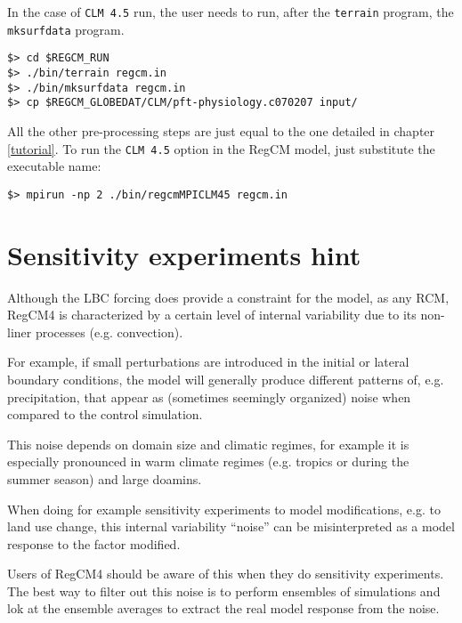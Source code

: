 In the case of \verb=CLM 4.5= run, the user needs to run, after the
\verb=terrain= program, the \verb=mksurfdata= program.

\begin{Verbatim}
$> cd $REGCM_RUN
$> ./bin/terrain regcm.in
$> ./bin/mksurfdata regcm.in
$> cp $REGCM_GLOBEDAT/CLM/pft-physiology.c070207 input/
\end{Verbatim}

All the other pre-processing steps are just equal to the one detailed in
chapter \ref{tutorial}. To run the \verb=CLM 4.5= option in the RegCM model,
just substitute the executable name:

\begin{Verbatim}
$> mpirun -np 2 ./bin/regcmMPICLM45 regcm.in
\end{Verbatim}

\section{Sensitivity experiments hint}

Although the LBC forcing does provide a constraint for the model, as any RCM,
RegCM4 is characterized by a certain level of internal variability due to its
non-liner processes (e.g. convection).

For example, if small perturbations are introduced in the initial or lateral
boundary conditions, the model will generally produce different patterns of,
e.g. precipitation, that appear as (sometimes seemingly organized) noise when
compared to the control simulation.

This noise depends on domain size and climatic regimes, for example it is
especially pronounced in warm climate regimes (e.g. tropics or during the
summer season) and large doamins.

When doing for example sensitivity experiments to model modifications, e.g. to
land use change, this internal variability “noise” can be misinterpreted as a
model response to the factor modified.

Users of RegCM4 should be aware of this when they do sensitivity experiments.
The best way to filter out this noise is to perform ensembles of simulations
and lok at the ensemble averages to extract the real model response from the
noise.
